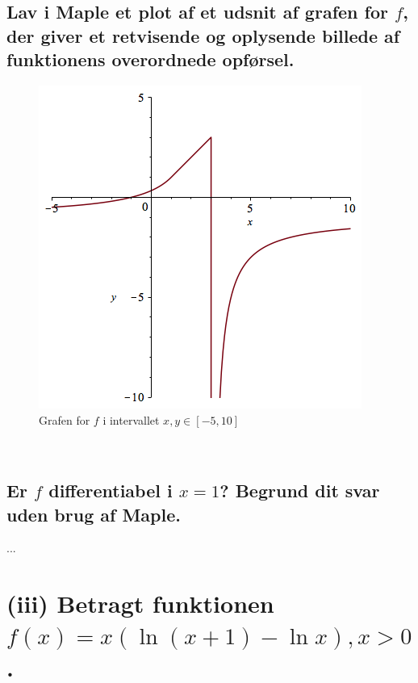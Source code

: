 \documentclass[11pt,a4paper]{article}
\begin{document}
\begin{multicols}{2}
    \subsection
    {
        \mdseries
        Lav i Maple et plot af et udsnit af grafen for $f$, der giver et
        retvisende og oplysende billede af funktionens overordnede opførsel.
    }

    \begin{figure}[H]
        \includegraphics[scale=0.5]{figures/3-2a-1.png}
        \caption{Grafen for $f$ i intervallet $x,y \in [-5,10]$}
        \label{fig:3.2a-1}
    \end{figure}

    \vfill{\ }\columnbreak

    \subsection
    {
        \mdseries
        Er $f$ differentiabel i $x=1$? Begrund dit svar uden brug af Maple.
    }
    ...

\end{multicols}


\section
{
    (iii) \mdseries
    Betragt funktionen $f(x) = x(\ln(x + 1) - \ln x), x > 0$.
}

\end{document}

